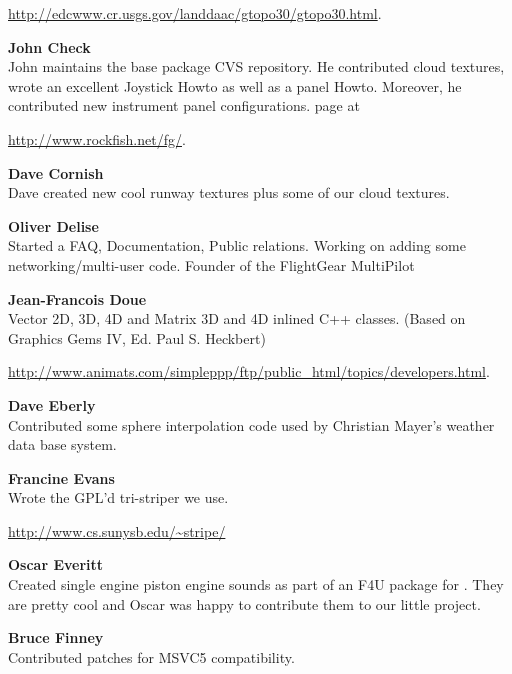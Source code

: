   \href{http://edcwww.cr.usgs.gov/landdaac/gtopo30/gtopo30.html}{http://edcwww.cr.usgs.gov/landdaac/gtopo30/gtopo30.html}.
 \medskip

\noindent \textbf{John Check}\\
 John maintains the base package CVS repository. He contributed cloud textures, wrote an excellent Joystick Howto as well as a panel Howto. Moreover, he contributed new instrument panel configurations. \FlightGear{}
 page at
 \medskip

 \href{http://www.rockfish.net/fg/}{http://www.rockfish.net/fg/}.
 \medskip

\noindent \textbf{Dave Cornish}\\
 Dave created new cool runway textures plus some of our cloud textures.
 \medskip

\noindent \textbf{Oliver Delise} \\
 Started a FAQ, Documentation, Public relations. Working on adding some
  networking/multi-user code. Founder of the FlightGear MultiPilot
\medskip

\noindent \textbf{Jean-Francois Doue}\\
  Vector 2D, 3D, 4D and Matrix 3D and 4D inlined C++ classes.  (Based on
  Graphics Gems IV, Ed. Paul S. Heckbert)
  \medskip

\href{http://www.animats.com/simpleppp/ftp/public_html/topics/developers.html}{http://www.animats.com/simpleppp/ftp/public\_html/topics/developers.html}.
 \medskip

\noindent \textbf{Dave Eberly} \\
  Contributed some sphere interpolation code used by Christian Mayer's
  weather data base system.
  \medskip

\noindent \textbf{Francine Evans}\\
  Wrote the GPL'd tri-striper we use.
  \medskip

\href{http://www.cs.sunysb.edu/~stripe/}{http://www.cs.sunysb.edu/\~{}stripe/}
\medskip

\noindent \textbf{Oscar Everitt}\\
  Created single engine piston engine sounds as part of an F4U package
  for .  They are pretty cool and Oscar was happy to contribute
  them to our little project.
 \medskip

\noindent \textbf{Bruce Finney}\\
  Contributed patches for MSVC5 compatibility.
 \medskip


